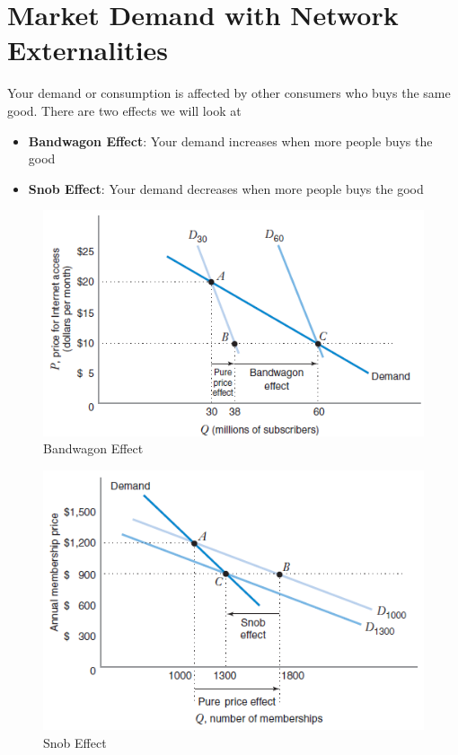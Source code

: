 \documentclass[../ECON-281-Notes.tex]{subfiles}
\begin{document}
\section{Market Demand with Network Externalities}
Your demand or consumption is affected by other consumers who buys the same good. 
There are two effects we will look at
\begin{itemize}
    \item \textbf{Bandwagon Effect}: Your demand increases when more people buys the good
    \item \textbf{Snob Effect}: Your demand decreases when more people buys the good
\end{itemize}
\begin{figure}[!t]
    \centering
    \includegraphics[width=\columnwidth]{../assets/bandwagon.png}
    \caption{Bandwagon Effect}
    \label{fig:bandwagon_effect}
\end{figure}

\begin{figure}[!t]
    \centering
    \includegraphics[width=\columnwidth]{../assets/snob.png}
    \caption{Snob Effect}
    \label{fig:snob_effect}
\end{figure}
\end{document}
